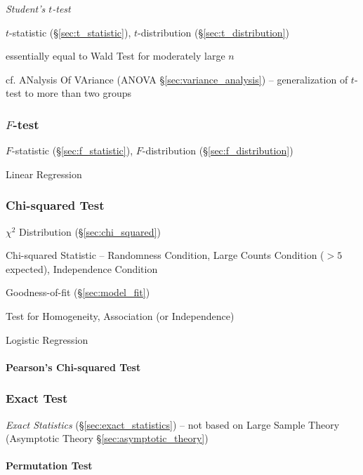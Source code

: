 \emph{Student's $t$-test}

\fist $t$-statistic (\S\ref{sec:t_statistic}), $t$-distribution
(\S\ref{sec:t_distribution})

essentially equal to Wald Test for moderately large $n$

\fist cf. ANalysis Of VAriance (ANOVA \S\ref{sec:variance_analysis}) --
generalization of $t$-test to more than two groups



\subsubsection{$F$-test}\label{sec:f_test}

\fist $F$-statistic (\S\ref{sec:f_statistic}),
$F$-distribution (\S\ref{sec:f_distribution})

Linear Regression



\subsubsection{Chi-squared Test}\label{sec:chi_squared_test}

$\chi^2$ Distribution (\S\ref{sec:chi_squared})

Chi-squared Statistic -- Randomness Condition, Large Counts Condition ($>5$
expected), Independence Condition

Goodness-of-fit (\S\ref{sec:model_fit})

Test for Homogeneity, Association (or Independence)

Logistic Regression



\paragraph{Pearson's Chi-squared Test}\label{sec:pearsons_chi_squared}\hfill



\subsubsection{Exact Test}\label{sec:exact_test}

\emph{Exact Statistics} (\S\ref{sec:exact_statistics}) -- not based on Large
Sample Theory (Asymptotic Theory \S\ref{sec:asymptotic_theory})



\paragraph{Permutation Test}\label{sec:permutation_test}\hfill

